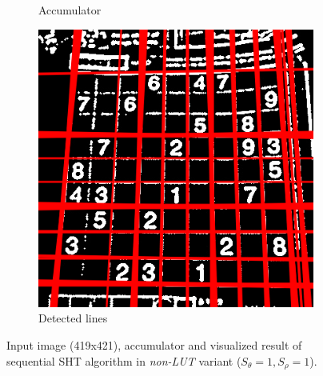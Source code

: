 \begin{figure}
\begin{subfigure}{0.3\textwidth}
        \caption{Accumulator}\label{fig:sht_example:b}
    \end{subfigure}\hfill
    \begin{subfigure}{0.3\textwidth}
        \includegraphics[width=\linewidth] {img/sht_result.png}
        \caption{Detected lines}\label{fig:sht_example:c}
    \end{subfigure}
    \caption{Input image (419x421), accumulator and visualized result of sequential SHT algorithm in \textit{non-LUT} variant ($S_\theta = 1, S_\rho=1$).}\label{fig:sht_example}
\end{figure}
